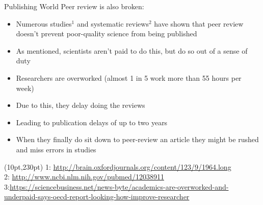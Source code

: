 \documentclass{beamer}
\begin{document}
\begin{frame}{Publishing World}
Peer review is also broken:
\begin{itemize}[<+->]
	\item Numerous studies$^{1}$ and systematic reviews$^{2}$ have shown that peer review doesn't prevent poor-quality science from being published
	\item As mentioned, scientists aren't paid to do this, but do so out of a sense of duty
	\item Researchers are overworked (almost 1 in 5 work more than 55 hours per week)
	\item Due to this, they delay doing the reviews 
	\item Leading to publication delays of up to two years
	\item When they finally do sit down to peer-review an article they might be rushed and miss errors in studies
\end{itemize}
\begin{textblock*}{300pt}(10pt,230pt)
	\tiny{1: \url{http://brain.oxfordjournals.org/content/123/9/1964.long}\\ 2: \url{http://www.ncbi.nlm.nih.gov/pubmed/12038911}\\ 3:\url{https://sciencebusiness.net/news-byte/academics-are-overworked-and-underpaid-says-oecd-report-looking-how-improve-researcher}}

\end{textblock*}
\end{frame}

\end{document}
